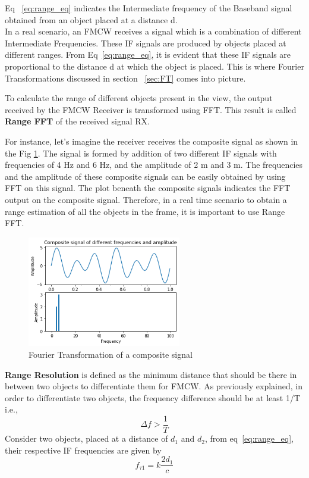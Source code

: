 Eq ~\ref{eq:range_eq} indicates the Intermediate frequency of the Baseband signal obtained from an object placed at a distance d.
\\


In a real scenario, an FMCW receives a signal which is a combination of different Intermediate Frequencies. These IF signals are produced by objects placed at different ranges. From Eq~\ref{eq:range_eq}, it is evident that these IF signals are proportional to the distance d at which the object is placed.
This is where Fourier Transformations discussed in section ~\ref{sec:FT} comes into picture.

To calculate the range of different objects present in the view, the output received by the FMCW Receiver is transformed using FFT. This result is called \textbf{Range FFT} of the received signal RX.

For instance, let's imagine the receiver receives the composite signal as shown in the Fig \ref{fig:comp_fft}. The signal is formed by addition of two different IF signals with frequencies of 4 Hz and 6 Hz, and the amplitude of 2 m and 3 m.
The frequencies and the amplitude of these composite signals can be easily obtained by using FFT on this signal. The plot beneath the composite signals indicates the FFT output on the composite signal.
Therefore, in a real time scenario to obtain a range estimation of all the objects in the frame, it is important to use Range FFT.
 \begin{figure}[ht]
  \begin{center}
    \includegraphics[width=0.6\textwidth]{Master's thesis/images/comp_fft.png} 
    \caption{Fourier Transformation of a composite signal}
    \label{fig:comp_fft}
  \end{center}
\end{figure}  

\textbf{Range Resolution} is defined as the minimum distance that should be there in between two objects to differentiate them for FMCW. As previously explained, in order to differentiate two objects, the frequency difference should be at least 1/T i.e., 
\begin{equation}\label{eq:fgtt}
 \Delta f > \frac{1}{T}  
\end{equation}Consider two objects, placed at a distance of $d_{1}$ and $d_{2}$, from eq~\ref{eq:range_eq}, their respective IF frequencies are given by
 \begin{equation}
   f_{\tau1}= k\frac{2d_{1}}{c}
 \end{equation} 
 
